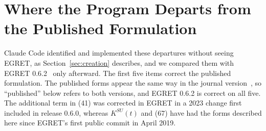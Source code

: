 \documentclass[11pt]{article}
\begin{document}
\section{Where the Program Departs from the Published Formulation}
\label{app:departures}

Claude Code identified and implemented these departures without seeing EGRET, as Section~\ref{sec:creation} describes, and we compared them with EGRET 0.6.2~\cite{egret} only afterward. The first five items correct the published formulation. The published forms appear the same way in the journal version~\cite{knueven2020}, so ``published'' below refers to both versions, and EGRET 0.6.2 is correct on all five. The additional term in (41) was corrected in EGRET in a 2023 change first included in release 0.6.0, whereas $K^{SU}(t)$ and (67) have had the forms described here since EGRET's first public commit in April 2019.
\end{document}
